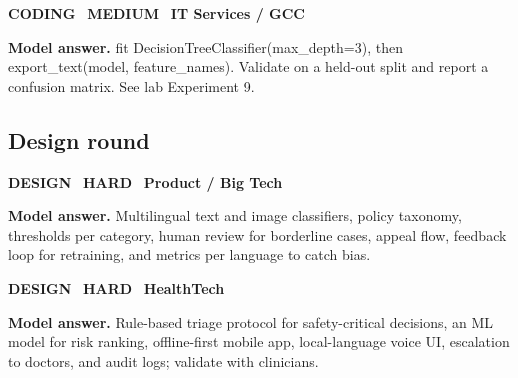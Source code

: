 \documentclass[11pt]{article}
\begin{document}
\begin{tcolorbox}[enhanced,breakable,colback=white,colframe=navyL,arc=2mm,boxrule=0.8pt,left=3mm,right=3mm,
 title={\textbf{QV.09}\quad Build a decision tree with scikit-learn and extract human-readable rules.},fonttitle=\color{white}\small,colbacktitle=navyL]
\colorbox{navyL!15}{\scriptsize\bfseries\color{navyL} CODING}\
\colorbox{gold!85!black!15}{\scriptsize\bfseries\color{gold!85!black} MEDIUM}\
\colorbox{navy!8}{\scriptsize\bfseries\color{navy} IT Services / GCC}\par\smallskip
\textbf{\color{navy}Model answer.} fit DecisionTreeClassifier(max\_depth=3), then export\_text(model, feature\_names). Validate on a held-out split and report a confusion matrix. See lab Experiment 9.
\end{tcolorbox}
\subsection*{\color{crimson}Design round}
\begin{tcolorbox}[enhanced,breakable,colback=white,colframe=crimson,arc=2mm,boxrule=0.8pt,left=3mm,right=3mm,
 title={\textbf{QV.10}\quad Design a content-moderation system for a social platform in Indian languages.},fonttitle=\color{white}\small,colbacktitle=crimson]
\colorbox{crimson!15}{\scriptsize\bfseries\color{crimson} DESIGN}\
\colorbox{crimson!15}{\scriptsize\bfseries\color{crimson} HARD}\
\colorbox{navy!8}{\scriptsize\bfseries\color{navy} Product / Big Tech}\par\smallskip
\textbf{\color{navy}Model answer.} Multilingual text and image classifiers, policy taxonomy, thresholds per category, human review for borderline cases, appeal flow, feedback loop for retraining, and metrics per language to catch bias.
\end{tcolorbox}
\begin{tcolorbox}[enhanced,breakable,colback=white,colframe=crimson,arc=2mm,boxrule=0.8pt,left=3mm,right=3mm,
 title={\textbf{QV.11}\quad Design an expert-system-plus-ML assistant for rural primary-health workers.},fonttitle=\color{white}\small,colbacktitle=crimson]
\colorbox{crimson!15}{\scriptsize\bfseries\color{crimson} DESIGN}\
\colorbox{crimson!15}{\scriptsize\bfseries\color{crimson} HARD}\
\colorbox{navy!8}{\scriptsize\bfseries\color{navy} HealthTech}\par\smallskip
\textbf{\color{navy}Model answer.} Rule-based triage protocol for safety-critical decisions, an ML model for risk ranking, offline-first mobile app, local-language voice UI, escalation to doctors, and audit logs; validate with clinicians.
\end{tcolorbox}
\end{document}
